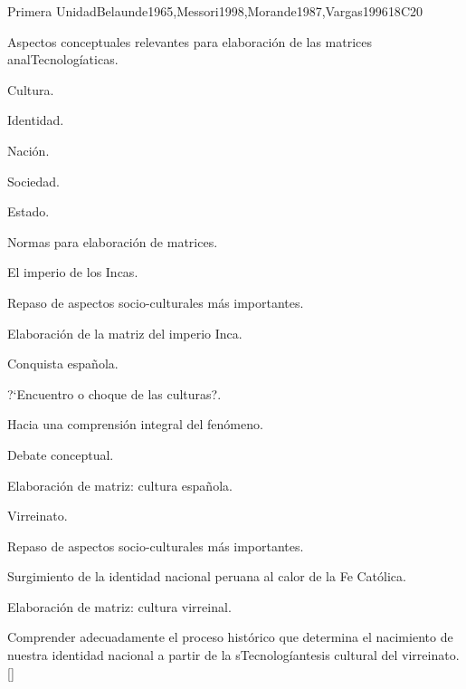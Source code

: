 \begin{syllabus}
\begin{unit}{}{Primera Unidad}{Belaunde1965,Messori1998,Morande1987,Vargas1996}{18}{C20}
\begin{topics}
	\item Aspectos conceptuales relevantes para elaboración de las matrices analTecnologíaticas.
	    \begin{subtopics}
		\item Cultura.
		\item Identidad.
		\item Nación.
		\item Sociedad.
		\item Estado.
		\item Normas para elaboración de matrices.
	    \end{subtopics}
	\item El imperio de los Incas.
	     \begin{subtopics}
		\item Repaso de  aspectos socio-culturales más importantes.
		\item Elaboración de la matriz del imperio Inca.
	     \end{subtopics}
	\item Conquista española.
	    \begin{subtopics}
		\item ?`Encuentro o choque de las culturas?.
		\item Hacia una comprensión integral del fenómeno.
		\item Debate conceptual.
		\item Elaboración de matriz: cultura española.
	    \end{subtopics}
	\item Virreinato.
	    \begin{subtopics}
		\item Repaso de  aspectos socio-culturales más importantes.
		\item Surgimiento de la identidad nacional peruana al calor de la Fe Católica.
		\item Elaboración de matriz: cultura virreinal.	
	    \end{subtopics}
\end{topics}
\begin{learningoutcomes}
	\item Comprender adecuadamente el proceso histórico que determina el nacimiento de nuestra identidad nacional a partir de la sTecnologíantesis cultural del virreinato.[\Familiarity]
\end{learningoutcomes}
\end{unit}


\end{syllabus}
